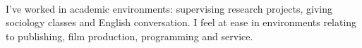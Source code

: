 \documentclass[a4paper,hidelinks]{twentysecondcv} %
\begin{document}
\\
I've worked in academic environments: supervising research projects, giving sociology classes and English conversation. %
I feel at ease in environments relating to publishing, film production, programming and service.

\end{document}
